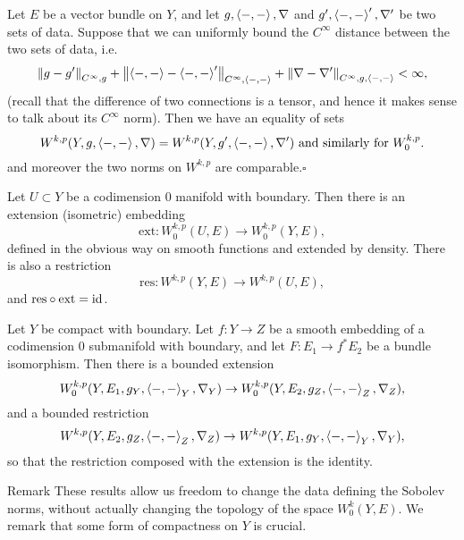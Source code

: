 \begin{thm}
  Let $E$ be a vector bundle on $Y$, and let $g,\left\langle-,-\right\rangle,\nabla$ and $g',\left\langle-,-\right\rangle',\nabla'$ be two sets of data. Suppose that we can uniformly bound the $C^{\infty}$ distance between the two sets of data, i.e.\
  \begin{equation*}
 \left\lVert g-g'\right\rVert_{C^{\infty},g}+\left\lVert\left\langle-,-\right\rangle-\left\langle-,-\right\rangle'\right\rVert_{C^{\infty},\left\langle-,-\right\rangle}+\left\lVert\nabla-\nabla'\right\rVert_{C^{\infty},g,\left\langle-,-\right\rangle}<\infty,
  \end{equation*}
  (recall that the difference of two connections is a tensor, and hence it makes sense to talk about its $C^{\infty}$ norm). Then we have an equality of sets
  \begin{equation*}
    W^{k,p}(Y,g,\left\langle-,-\right\rangle,\nabla)=W^{k,p}(Y,g',\left\langle-,-\right\rangle,\nabla')\text{ and similarly for $W^{k,p}_{0}$}.  \end{equation*}
  and moreover the two norms on $W^{k,p}$ are comparable.\hfill$\square$
\end{thm}
\begin{thm}
  Let $U\subset Y$ be a codimension $0$ manifold with boundary. Then there is an extension (isometric) embedding
  \begin{equation*}
    \text{ext}:W^{k,p}_{0}(U,E)\to W^{k,p}_{0}(Y,E),
  \end{equation*}
  defined in the obvious way on smooth functions and extended by density. There is also a restriction
  \begin{equation*}
    \text{res}:W^{k,p}(Y,E)\to W^{k,p}(U,E),
  \end{equation*}
  and $\text{res}\circ \text{ext}=\mathrm{id}$.
\end{thm}
\begin{cor}
  Let $Y$ be compact with boundary. Let $f:Y\to Z$ be a smooth
  embedding of a codimension $0$ submanifold with boundary, and let
  $F:E_{1}\to f^{*}E_{2}$ be a bundle isomorphism. Then there is a
  bounded extension
  \begin{equation*}
    W^{k,p}_{0}(Y,E_{1},g_{Y},\left\langle-,-\right\rangle_{Y},\nabla_{Y})\to W^{k,p}_{0}(Y,E_{2},g_{Z},\left\langle-,-\right\rangle_{Z},\nabla_{Z}),
  \end{equation*}
  and a bounded restriction
  \begin{equation*}
    W^{k,p}(Y,E_{2},g_{Z},\left\langle-,-\right\rangle_{Z},\nabla_{Z})\to W^{k,p}(Y,E_{1},g_{Y},\left\langle-,-\right\rangle_{Y},\nabla_{Y}),
  \end{equation*}
  so that the restriction composed with the extension is the identity. 
\end{cor}
\begin{clear}{Remark}
  These results allow us freedom to change the data defining the Sobolev norms, without actually changing the topology of the space $W^{k}_{0}(Y,E)$. We remark that some form of compactness on $Y$ is crucial. 
\end{clear}
